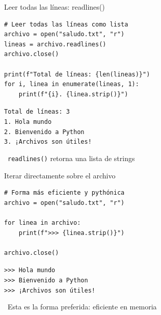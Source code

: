 \documentclass{beamer}
\begin{document}
\begin{frame}[fragile]{Leer todas las líneas: readlines() \faList}
\begin{lstlisting}
# Leer todas las líneas como lista
archivo = open("saludo.txt", "r")
lineas = archivo.readlines()
archivo.close()

print(f"Total de líneas: {len(lineas)}")
for i, linea in enumerate(lineas, 1):
    print(f"{i}. {linea.strip()}")
\end{lstlisting}

\vspace{-0.2cm}
\begin{tcolorbox}[colback=green!10,colframe=green,title={\small\faArrowCircleRight \ Salida},coltitle=fg0,left=3pt,right=3pt,top=2pt,bottom=2pt,boxsep=1pt]
\small\texttt{Total de líneas: 3\\
1. Hola mundo\\
2. Bienvenido a Python\\
3. ¡Archivos son útiles!}
\end{tcolorbox}

\vspace{-0.1cm}
\begin{notebox}
\small\faCheckCircle\ \texttt{readlines()} retorna una lista de strings
\end{notebox}
\end{frame}

\begin{frame}[fragile]{Iterar directamente sobre el archivo \faRedo}
\begin{lstlisting}
# Forma más eficiente y pythónica
archivo = open("saludo.txt", "r")

for linea in archivo:
    print(f">>> {linea.strip()}")

archivo.close()
\end{lstlisting}

\vspace{-0.2cm}
\begin{tcolorbox}[colback=green!10,colframe=green,title={\small\faArrowCircleRight \ Salida},coltitle=fg0,left=3pt,right=3pt,top=2pt,bottom=2pt,boxsep=1pt]
\small\texttt{>>> Hola mundo\\
>>> Bienvenido a Python\\
>>> ¡Archivos son útiles!}
\end{tcolorbox}

\vspace{-0.1cm}
\begin{notebox}
\small\faLightbulb\ Esta es la forma preferida: eficiente en memoria
\end{notebox}
\end{frame}
\end{document}
